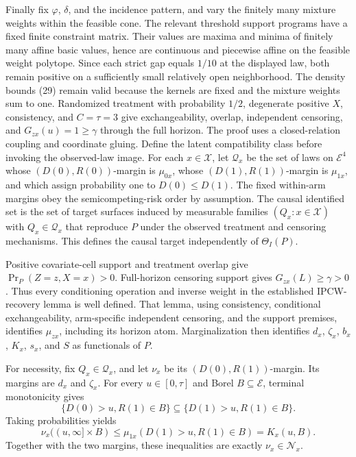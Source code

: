 Finally fix \(\varphi\), \(\delta\), and the incidence pattern, and vary the finitely many mixture weights within the feasible cone.  The relevant threshold support programs have a fixed finite constraint matrix.  Their values are maxima and minima of finitely many affine basic values, hence are continuous and piecewise affine on the feasible weight polytope.  Since each strict gap equals \(1/10\) at the displayed law, both remain positive on a sufficiently small relatively open neighborhood.  The density bounds (29) remain valid because the kernels are fixed and the mixture weights sum to one.  Randomized treatment with probability \(1/2\), degenerate positive \(X\), consistency, and \(C=\tau=3\) give exchangeability, overlap, independent censoring, and \(G_{zx}(u)=1\geq\gamma\) through the full horizon.
The proof uses a closed-relation coupling and coordinate gluing.  Define the latent compatibility class before invoking the observed-law image.  For each \(x\in\mathcal X\), let \(\mathcal Q_x\) be the set of laws on \(\mathcal E^4\) whose \((D(0),R(0))\)-margin is \(\mu_{0x}\), whose \((D(1),R(1))\)-margin is \(\mu_{1x}\), and which assign probability one to \(D(0)\leq D(1)\).  The fixed within-arm margins obey the semicompeting-risk order by assumption.  The causal identified set is the set of target surfaces induced by measurable families \((Q_x:x\in\mathcal X)\) with \(Q_x\in\mathcal Q_x\) that reproduce \(P\) under the observed treatment and censoring mechanisms.  This defines the causal target independently of \(\Theta_I(P)\).

Positive covariate-cell support and treatment overlap give \(\Pr_P(Z=z,X=x)>0\).  Full-horizon censoring support gives \(G_{zx}(L)\geq\gamma>0\).  Thus every conditioning operation and inverse weight in the established IPCW-recovery lemma is well defined.  That lemma, using consistency, conditional exchangeability, arm-specific independent censoring, and the support premises, identifies \(\mu_{zx}\), including its horizon atom.  Marginalization then identifies \(d_x\), \(\zeta_x\), \(b_x\), \(K_x\), \(s_x\), and \(S\) as functionals of \(P\).

For necessity, fix \(Q_x\in\mathcal Q_x\), and let \(\nu_x\) be its \((D(0),R(1))\)-margin.  Its margins are \(d_x\) and \(\zeta_x\).  For every \(u\in[0,\tau]\) and Borel \(B\subseteq\mathcal E\), terminal monotonicity gives
\[
\{D(0)>u,R(1)\in B\}
\subseteq
\{D(1)>u,R(1)\in B\}.
\]
Taking probabilities yields
\[
\nu_x((u,\infty]\times B)
\leq\mu_{1x}(D(1)>u,R(1)\in B)=K_x(u,B).
\]
Together with the two margins, these inequalities are exactly \(\nu_x\in\mathcal N_x\).

